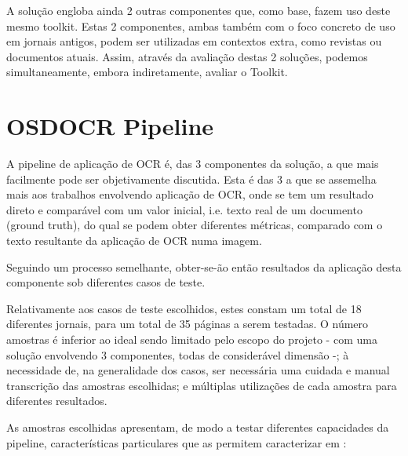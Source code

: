 A solução engloba ainda 2 outras componentes que, como base, fazem uso deste mesmo toolkit. Estas 2 componentes, ambas também com o foco concreto de uso em jornais antigos, podem ser utilizadas em contextos extra, como revistas ou documentos atuais. Assim, através da avaliação destas 2 soluções, podemos simultaneamente, embora indiretamente, avaliar o Toolkit.



\section{OSDOCR Pipeline}


A pipeline de aplicação de OCR é, das 3 componentes da solução, a que mais facilmente pode ser objetivamente discutida. Esta é das 3 a que se assemelha mais aos trabalhos envolvendo aplicação de OCR, onde se tem um resultado direto e comparável com um valor inicial, i.e. texto real de um documento (ground truth), do qual se podem obter diferentes métricas, comparado com o texto resultante da aplicação de OCR numa imagem.

Seguindo um processo semelhante, obter-se-ão então resultados da aplicação desta componente sob diferentes casos de teste. 

Relativamente aos casos de teste escolhidos, estes constam um total de 18 diferentes jornais, para um total de 35 páginas a serem testadas. O número amostras é inferior ao ideal sendo limitado pelo escopo do projeto - com uma solução envolvendo 3 componentes, todas de considerável dimensão -; à necessidade de, na generalidade dos casos, ser necessária uma cuidada e manual transcrição das amostras escolhidas; e múltiplas utilizações de cada amostra para diferentes resultados.

As amostras escolhidas apresentam, de modo a testar diferentes capacidades da pipeline, características particulares que as permitem caracterizar em :

